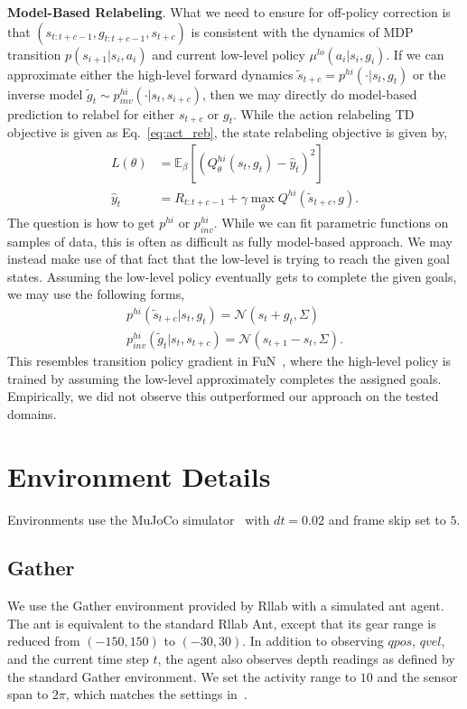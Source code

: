 \documentclass{article}
\begin{document}
\textbf{Model-Based Relabeling}. What we need to ensure for off-policy correction is that $(s_{t:t+c-1},g_{t:t+c-1},s_{t+c})$ is consistent with the dynamics of MDP transition $p(s_{i+1}|s_i,a_i)$ and current low-level policy $\mu^{lo}(a_i|s_i,g_i)$. If we can approximate either the high-level forward dynamics $\tilde{s}_{t+c}=p^{hi}(\cdot|s_t,g_t)$ or the inverse model $\tilde{g}_{t}\sim p^{hi}_{inv}(\cdot|s_t,s_{i+c})$, then we may directly do model-based prediction to relabel for either $s_{t+c}$ or $g_t$. While the action relabeling TD objective is given as Eq.~\ref{eq:act_reb}, the state relabeling objective is given by,
\begin{align}
 L(\theta) &= \mathbb{E}_{\beta}\left[ \left( Q_\theta^{hi}(s_t,g_t)  - \hat{y}_t\right)^2 \right] \\ \label{eq:act_reb2}
 \hat{y}_t &= R_{t:t+c-1} + \gamma \max_{g} Q^{hi} (\tilde{s}_{t+c},g).
\end{align}
The question is how to get $p^{hi}$ or $p^{hi}_{inv}$. While we can fit parametric functions on samples of data, this is often as difficult as fully model-based approach. We may instead make use of that fact that  the low-level is trying to reach the given goal states. Assuming the low-level policy eventually gets to complete the given goals, we may use the following forms,
\begin{align}
p^{hi}(\tilde{s}_{t+c}|s_t,g_t) = \mathcal{N}(s_t+g_t,\Sigma)\\
p^{hi}_{inv}(\tilde{g}_{t}|s_t,s_{t+c}) = \mathcal{N}(s_{t+1}-s_t,\Sigma).
\end{align}
This resembles transition policy gradient in FuN~\cite{vezhnevets2017feudal},
where the high-level policy is trained by assuming the low-level approximately completes the assigned goals.
Empirically, we did not observe this outperformed our approach on the tested domains.

\section{Environment Details}
Environments use the MuJoCo simulator~\cite{mujoco} with $dt=0.02$ and frame skip set to $5$.

\subsection{Gather}
We use the Gather environment provided by Rllab with a simulated ant agent.
The ant
is equivalent to the standard Rllab Ant, except that its gear range is reduced from $(-150, 150)$ to $(-30, 30)$.
In addition to observing $qpos$, $qvel$, and the current time step $t$, the agent also observes depth readings as defined by the standard Gather environment.  
We set the activity range to $10$ and the sensor span to $2\pi$, which matches the settings in~\cite{florensa2017stochastic}.
\end{document}
